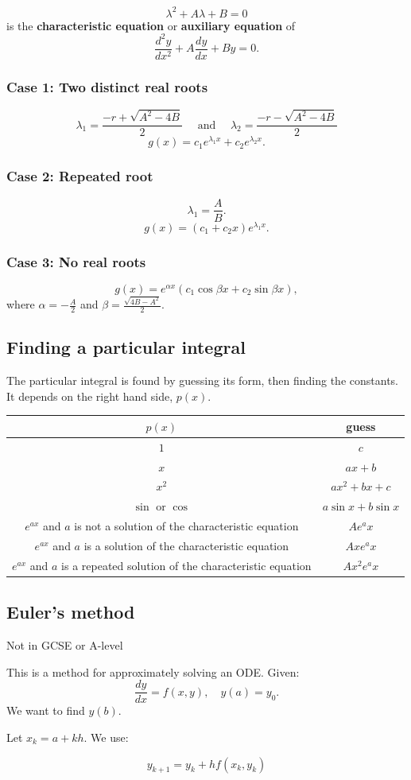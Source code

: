 \documentclass[11pt,a4paper,oneside]{book}
\begin{document}
\begin{definition}
\[\lambda^2+A\lambda+B=0\] is the \textbf{characteristic equation} or \textbf{auxiliary equation} of 
\[\frac{d^2y}{dx^2} + A\frac{dy}{dx} + By = 0.\]
\end{definition}

\subsubsection{Case 1: Two distinct real roots}
\[\lambda_1=\frac{-r+\sqrt{A^2-4B}}{2}\quad\text{ and }\quad \lambda_2=\frac{-r-\sqrt{A^2-4B}}{2}\]
\[g(x)=c_1e^{\lambda_1x}+c_2e^{\lambda_2x}.\]

\subsubsection{Case 2: Repeated root}
\[\lambda_1=\frac{A}{B}.\]
\[g(x)=(c_1+c_2x)e^{\lambda_1x}.\]

\subsubsection{Case 3: No real roots}
\[g(x)=e^{\alpha x}\left( c_1\cos \beta x + c_2\sin \beta x \right),\]
where \(\alpha=-\frac{A}{2}\) and \(\beta=\frac{\sqrt{4B-A^2}}{2}\).

\subsection{Finding a particular integral}

The particular integral is found by guessing its form, then finding the constants. It depends on the right hand side, $p(x)$.

\begin{tabular}{|c|c|}
\hline
$p(x)$&guess\\
\hline
$1$&$c$\\
$x$&$ax+b$\\
$x^2$&$ax^2+bx+c$\\
$\sin$ or $\cos$&$a\sin x+b\sin x$\\
$e^{ax}$ and $a$ is not a solution of the characteristic equation&$Ae^ax$\\
$e^{ax}$ and $a$ is a solution of the characteristic equation&$Axe^ax$\\
$e^{ax}$ and $a$ is a repeated solution of the characteristic equation&$Ax^2e^ax$\\
\hline
\end{tabular}
\subsection{Euler's method}
\begin{gce}
Not in GCSE or A-level
\end{gce}
This is a method for approximately solving an ODE. Given:
\[\frac{dy}{dx}=f(x,y),\quad y(a)=y_0.\]
We want to find $y(b)$.

Let $x_k = a+kh$. We use:

\[y_{k+1}=y_k + hf(x_k,y_k)\]
\end{document}
